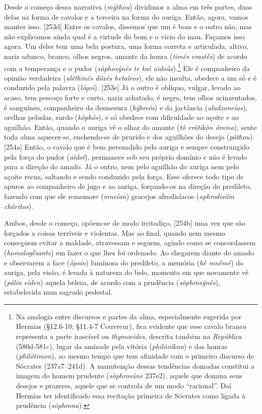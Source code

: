 Desde o começo dessa narrativa (\emph{mýthou}) dividimos a alma em três
partes, duas delas na forma de cavalos e a terceira na forma do auriga.
Então, agora, vamos manter isso. {[}253d{]} Entre os cavalos, dissemos
que um é bom e o outro não, mas não explicamos ainda qual é a virtude do
bom e o vício do mau. Façamos isso agora. Um deles tem uma bela postura,
uma forma correta e articulada, altivo, nariz adunco, branco, olhos
negros, amante da honra (\emph{timês erastḕs}) de acordo com a
temperança e o pudor (\emph{sôphosýnês te kaì aidoûs}).\footnote{Na
  analogia entre discursos e partes da alma, especialmente sugerida por
  Hermias (§12.6-10; §11.4-7 Couvreur), fica evidente que esse cavalo
  branco representa a parte irascível ou \emph{thymoeides}, descrita
  também na \emph{República} (580d-581c), lugar da amizade pela vitória
  (\emph{philónikon}) e das honras (\emph{philótimon}), ao mesmo tempo
  que tem afinidade com o primeiro discurso de Sócrates (237a7--241d). A
  manutenção dessas tendências domadas constitui a imagem do homem
  prudente (\emph{sôphrosúne} 237e2), aquele que domina seus desejos e
  prazeres, aquele que se controla de um modo ``racional''. Daí Hermias
  ter identificado essa recitação primeira de Sócrates como ligada à
  prudência (\emph{sóphrona}).} Ele é companheiro da opinião verdadeira
(\emph{alêthinês dóxês hetaîros}), ele não insulta, obedece a um só e é
conduzido pela palavra (\emph{lógoi}). {[}253e{]} Já o outro é oblíquo,
vulgar, levado ao acaso, tem pescoço forte e curto, nariz achatado, é
negro, tem olhos acinzentados, é sanguíneo, companheiro da desmesura
(\emph{hýbreôs}) e da jactância (\emph{aladzoneías}), orelhas peludas,
surdo (\emph{kôphós}), e só obedece com dificuldade ao açoite e ao
aguilhão. Então, quando o auriga vê o olhar do amante (\emph{tò erôtikòn
ómma}), sente toda alma aquecer-se, enchendo-se de prurido e dos
aguilhões do desejo (\emph{póthou}). {[}254a{]} Então, o cavalo que é
bem persuadido pelo auriga e sempre constrangido pela força do pudor
(\emph{aidoî}), permanece sob seu próprio domínio e não é levado para a
direção do amado. Já o outro, nem pelo aguilhão do auriga nem pelo
açoite recua, saltando e sendo conduzido pela força. Esse oferece todo
tipo de apuros ao companheiro de jugo e ao auriga, forçando-os na
direção do predileto, fazendo com que ele rememore (\emph{mneían})
gracejos afrodisíacos (\emph{aphrodisíôn cháritos}).

Ambos, desde o começo, opõem-se de modo irritadiço, {[}254b{]} uma vez
que são forçados a coisas terríveis e violentas. Mas ao final, quando
nem mesmo conseguem evitar a maldade, atravessam e seguem, agindo como
se concordassem (\emph{homologḗsante}) em fazer o que lhes foi ordenado.
Ao chegarem diante do amado e observarem a face (\emph{ópsin}) luminosa
do predileto, a memória (\emph{hê mnḗmê}) do auriga, pela visão, é
levada à natureza do belo, momento em que novamente vê (\emph{pálin
eîden}) aquela beleza, de acordo com a prudência (\emph{sôphrosýnês}),
estabelecida num sagrado pedestal.

